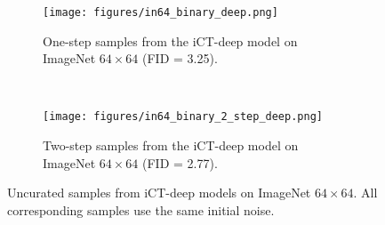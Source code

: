 \newpage
\begin{figure}
    \centering
    \begin{subfigure}[b]{\textwidth}
        \texttt{[image: figures/in64\_binary\_deep.png]}
        \caption{One-step samples from the iCT-deep model on ImageNet $64\times 64$ (FID = 3.25).}
    \end{subfigure}\\
    \begin{subfigure}[b]{\textwidth}
        \texttt{[image: figures/in64\_binary\_2\_step\_deep.png]}
        \caption{Two-step samples from the iCT-deep model on ImageNet $64\times 64$ (FID = 2.77).}
    \end{subfigure}
    \caption{Uncurated samples from iCT-deep models on ImageNet $64\times 64$. All corresponding samples use the same initial noise.}
    \label{fig:imagenet_ict_deep}
\end{figure}
